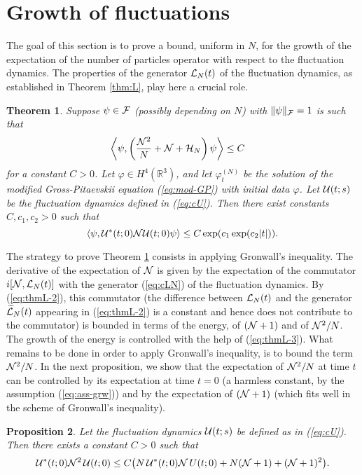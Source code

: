 \documentclass[11pt,a4paper]{article}
\newtheorem{thm}{Theorem}[section]  %
\newtheorem{proposition}[thm]{Proposition}
\newcommand{\cU}{{\cal U}}
\newcommand{\bR}{{\mathbb R}}
\newcommand{\wt}{\widetilde}
\newcommand{\cF}{{\cal F}}
\newcommand{\cH}{{\cal H}}
\newcommand{\cL}{{\cal L}}
\newcommand{\cN}{{\cal N}}
\newcommand{\N}{\mathcal{N}}
\begin{document}
\section{Growth of fluctuations}
\label{s:growthoffluct}
The goal of this section is to prove a bound, uniform in $N$, for the growth of the expectation of the number of particles operator with respect to the fluctuation dynamics. The properties of the generator $\cL_N (t)$ of the fluctuation dynamics, as established in Theorem \ref{thm:L}, play here a crucial role.

\begin{thm}\label{thm:N}
Suppose $\psi \in \cF$ (possibly depending on $N$) with $\| \psi \|_\cF  =1$ is such that \begin{equation}\label{eq:ass-grw} \begin{split} \left\langle \psi , \left( \frac{\cN^2}{N} + \cN + \cH_N \right) \psi \right\rangle &\leq C  \end{split} \end{equation}
for a constant $C>0$. Let $\varphi \in H^4 (\bR^3)$, and let $\varphi_t^{(N)}$ be the solution of the modified Gross-Pitaevskii equation (\ref{eq:mod-GP}) with initial data $\varphi$. Let $\cU (t;s)$ be the fluctuation dynamics defined in (\ref{eq:cU}). Then there exist constants $C,c_1,c_2 > 0$ such that
\[ \langle \psi , \cU^* (t;0) \cN \cU (t;0) \psi \rangle \leq C \exp (c_1 \exp (c_2 |t|)). \] 
\end{thm}

The strategy to prove Theorem \ref{thm:N} consists in applying Gronwall's inequality. The derivative of the expectation of $\cN$ is given by the expectation of the commutator $i[\cN , \cL_N (t)]$ with the generator (\ref{eq:cLN}) of the fluctuation dynamics. By (\ref{eq:thmL-2}), this commutator (the difference between $\cL_N (t)$ and the generator $\wt{\cL}_N (t)$ appearing in (\ref{eq:thmL-2}) is a constant and hence does not contribute to the commutator) is bounded in terms of the energy, of $(\cN+ 1)$ and of $\cN^2/N$. The growth of the energy is controlled with the help of (\ref{eq:thmL-3}). What remains to be done in order to apply Gronwall's inequality, is to bound the term $\cN^2 / N$. In the next proposition, we show that the expectation of $\cN^2/N$ at time $t$ can be controlled by its expectation at time $t=0$ (a harmless constant, by the assumption (\ref{eq:ass-grw})) and by the expectation of $(\cN+1)$ (which fits well in the scheme of Gronwall's inequality). 

\begin{proposition} \label{prop:apri}
Let the fluctuation dynamics $\cU (t;s)$ be defined as in (\ref{eq:cU}). Then there exists a constant $C > 0$ such that
 \[ \cU^* (t;0) \N^2 \, \cU (t;0) \le C \big( N  \, \cU^* (t;0) \N \, U (t;0) + N (\N+1) + (\N+1)^2 \big).
 \]
\end{proposition}
\end{document}
